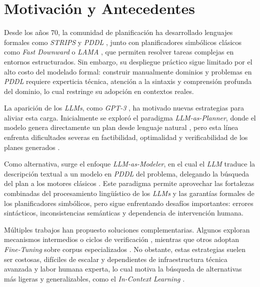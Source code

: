 \section*{Motivación y Antecedentes}

Desde los años 70, la comunidad de planificación ha desarrollado lenguajes formales como \textit{STRIPS} y \textit{PDDL} \parencite{fikes1971strips, aeronautiques1998pddl}, junto con planificadores simbólicos clásicos como \textit{Fast Downward} o \textit{LAMA} \parencite{helmert2006fast, richter2011lama}, que permiten resolver tareas complejas en entornos estructurados. Sin embargo, su despliegue práctico sigue limitado por el alto costo del modelado formal: construir manualmente dominios y problemas en \textit{PDDL} requiere experticia técnica, atención a la sintaxis y comprensión profunda del dominio, lo cual restringe su adopción en contextos reales.

La aparición de los \textit{LLMs}, como \textit{GPT-3} \parencite{brown2020language}, ha motivado nuevas estrategias para aliviar esta carga. Inicialmente se exploró el paradigma \textit{LLM-as-Planner}, donde el modelo genera directamente un plan desde lenguaje natural \parencite{aghzal2025survey, wei2025plangenllms}, pero esta línea enfrenta dificultades severas en factibilidad, optimalidad y verificabilidad de los planes generados \parencite{kambhampati2024position}.

Como alternativa, surge el enfoque \textit{LLM-as-Modeler}, en el cual el \textit{LLM} traduce la descripción textual a un modelo en \textit{PDDL} del problema, delegando la búsqueda del plan a los motores clásicos \parencite{tantakoun2025llms, liu2023llm+}. Este paradigma permite aprovechar las fortalezas combinadas del procesamiento lingüístico de los \textit{LLMs} y las garantías formales de los planificadores simbólicos, pero sigue enfrentando desafíos importantes: errores sintácticos, inconsistencias semánticas y dependencia de intervención humana.

Múltiples trabajos han propuesto soluciones complementarias. Algunos exploran mecanismos intermedios o ciclos de verificación \parencite{agarwal2024tic}, mientras que otros adoptan \textit{Fine-Tuning} sobre corpus especializados \parencite{zeng2023agenttuning, zuo2024planetarium}. No obstante, estas estrategias suelen ser costosas, difíciles de escalar y dependientes de infraestructura técnica avanzada y labor humana experta, lo cual motiva la búsqueda de alternativas más ligeras y generalizables, como el \textit{In-Context Learning} \parencite{dong2022survey}.


